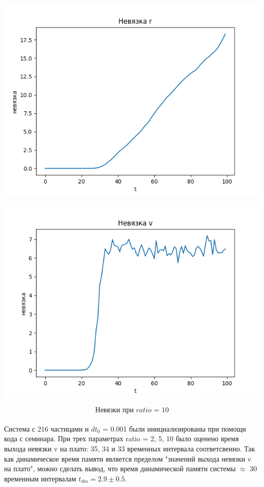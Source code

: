 \documentclass[a4paper, 12pt]{article}
\begin{document}
\begin{minipage}{0.47\textwidth}
\begin{center}
\includegraphics[scale=0.6]{r_div10}
\end{center}
\end{minipage}
\begin{minipage}{0.47\textwidth}
\begin{center}
\includegraphics[scale=0.6]{v_div10}
\end{center}
\end{minipage}
\[\textit{Невязки при ratio = 10}\]\\
Система с 216 частицами и $dt_0$ = 0.001 были инициализированы при помощи кода с семинара. При трех параметрах ratio = 2, 5, 10 было оценено время выхода невязки v на плато: 35, 34 и 33 временных интервала соответсвенно.
Так как динамическое время памяти является пределом "значений выхода невязки v на плато", можно сделать вывод, что время динамической памяти системы $\approx$ 30 временным интервалам $t_{dm} = 2.9 \pm 0.5$.
\end{document}
